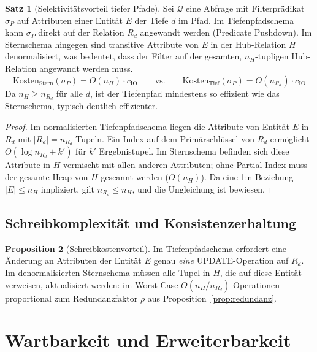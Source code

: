 ﻿\documentclass[a4paper,12pt]{report}
\theoremstyle{definition}
\newtheorem{theorem}{Satz}[chapter]
\newtheorem{proposition}[theorem]{Proposition}
\theoremstyle{remark}
\begin{document}
\begin{theorem}[Selektivitätsvorteil tiefer Pfade]
\label{thm:selektivitaet}
Sei $\mathcal{Q}$ eine Abfrage mit Filterprädikat $\sigma_P$ auf Attributen
einer Entität $E$ der Tiefe $d$ im Pfad. Im Tiefenpfadschema kann $\sigma_P$
direkt auf der Relation $R_d$ angewandt werden (Predicate Pushdown).
Im Sternschema hingegen sind transitive Attribute von $E$ in der Hub-Relation
$H$ de\-normalisiert, was bedeutet, dass der Filter auf der gesamten,
$n_H$-tupligen Hub-Relation angewandt werden muss.
\[
  \text{Kosten}_{\text{Stern}}(\sigma_P) = O(n_H) \cdot c_{\text{IO}}
  \qquad\text{vs.}\qquad
  \text{Kosten}_{\text{Tief}}(\sigma_P) = O(n_{R_d}) \cdot c_{\text{IO}}
\]
Da $n_H \geq n_{R_d}$ für alle $d$, ist der Tiefenpfad mindestens so
effizient wie das Sternschema, typisch deutlich effizienter.
\end{theorem}

\begin{proof}
Im normalisierten Tiefenpfadschema liegen die Attribute von Entität $E$ in
$R_d$ mit $|R_d| = n_{R_d}$ Tupeln. Ein Index auf dem Primärschlüssel von
$R_d$ ermöglicht $O(\log n_{R_d} + k')$ für $k'$ Ergebnistupel.
Im Sternschema befinden sich diese Attribute in $H$ vermischt mit allen anderen
Attributen; ohne Partial Index muss der gesamte Heap von $H$ gescannt werden
($O(n_H)$). Da eine 1:n-Beziehung $|E| \leq n_H$ impliziert, gilt
$n_{R_d} \leq n_H$, und die Ungleichung ist bewiesen.
\end{proof}

\subsection{Schreibkomplexität und Konsistenzerhaltung}

\begin{proposition}[Schreibkostenvorteil]
Im Tiefenpfadschema erfordert eine Änderung an Attributen der Entität $E$
genau \emph{eine} UPDATE-Operation auf $R_d$. Im denormalisierten
Sternschema müssen alle Tupel in $H$, die auf diese Entität verweisen,
aktualisiert werden: im Worst Case $O(n_H / n_{R_d})$ Operationen --
proportional zum Redundanzfaktor $\rho$ aus Proposition~\ref{prop:redundanz}.
\end{proposition}

\section{Wartbarkeit und Erweiterbarkeit}
\label{sec:wartbarkeit}
\end{document}

